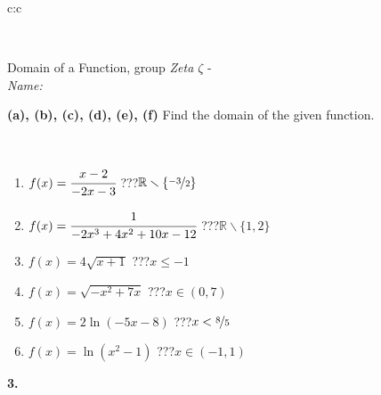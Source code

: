 \documentclass[10pt]{report}
\begin{document}
\begin{tabular}{c:c}
\begin{minipage}[c][104.5mm][t]{0.5\linewidth}
\begin{center}
\begin{minipage}{0.20\linewidth}
\begin{center}
\end{center}
\end{minipage}
\end{center}
\end{minipage}
\\ \hdashline
\begin{minipage}[c][104.5mm][t]{0.5\linewidth}
\begin{center}
\vspace{7mm}
{\huge Domain of a Function, group \textit{Zeta $\zeta$} -}\\[5mm]
\textit{Name:}\phantom{xxxxxxxxxxxxxxxxxxxxxxxxxxxxxxxxxxxxxxxxxxxxxxxxxxxxxxxxxxxxxxxxx}\\[5mm]
\begin{minipage}{0.95\linewidth}
\begin{center}
{
\textbf{(a), (b), (c), (d), (e), (f)} Find the domain of the given function. \\[1mm]
\phantom{x}
}
\end{center}
\end{minipage}
\\[4mm]
\begin{minipage}{0.79\linewidth}
\begin{center}
\begin{varwidth}{\linewidth}
\begin{enumerate}
\normalsizerrr
\item $f(x)=\cfrac{x-2}{-2x-3}$\quad \dotfill\; ???\;\dotfill \quad $ \mathbb{R} \smallsetminus\{\nicefrac{-3}{2} \}$
\item $f(x)=\cfrac{1}{-2x^3+4x^2+10x-12}$\quad \dotfill\; ???\;\dotfill \quad $ \mathbb{R} \smallsetminus\{1,2 \}$
\item $f(x)=4\sqrt{x+1}$\quad \dotfill\; ???\;\dotfill \quad $x\leq-1$
\item $f(x)=\sqrt{-x^2+7x}$\quad \dotfill\; ???\;\dotfill \quad $x\in(0 , 7)$
\item $f(x)=2\ln{(-5x-8)}$\quad \dotfill\; ???\;\dotfill \quad $x<\nicefrac{8}{5}$
\item $f(x)=\ln{(x^2-1)}$\quad \dotfill\; ???\;\dotfill \quad $x\in(-1 , 1)$
\end{enumerate}
\end{varwidth}
\end{center}
\end{minipage}
\begin{minipage}{0.20\linewidth}
\begin{center}
{\Huge\bfseries 3.} \\[2mm]

\end{center}
\end{minipage}
\end{center}
\end{minipage}
\end{tabular}
\end{document}
